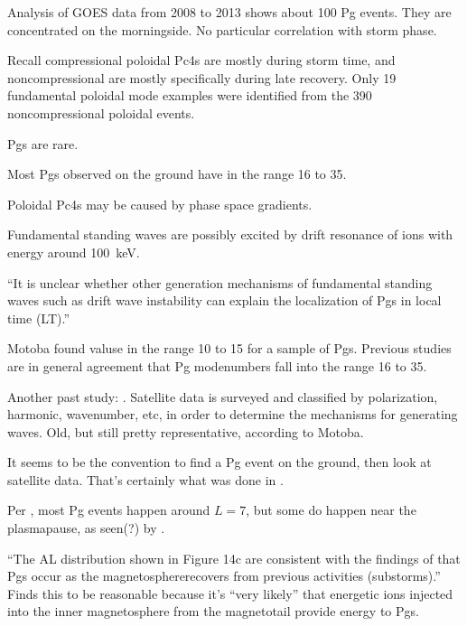 Analysis of GOES data from 2008 to 2013 shows about 100 Pg events. They are concentrated on the morningside. No particular correlation with storm phase\cite{motoba_2015}. 

Recall compressional poloidal Pc4s are mostly during storm time, and noncompressional are mostly specifically during late recovery\cite{dai_2015}. Only 19 fundamental poloidal mode examples were identified from the 390 noncompressional poloidal events. 

Pgs are rare\cite{brekke_1987}. 

Most Pgs observed on the ground have \azm in the range 16 to 35\cite{takahashi_1992}. 

Poloidal Pc4s may be caused by phase space gradients\cite{dai_2013}. 

Fundamental standing waves are possibly excited by drift resonance of ions with energy around \SI{100}{\kilo\eV}\cite{thompson_2001,dai_2013}. 

``It is unclear whether other generation mechanisms of fundamental standing waves such as drift wave instability\cite{green_1979} can explain the localization of Pgs in local time (LT).''\cite{motoba_2015}

Motoba\cite{motoba_2015} found \azm valuse in the range 10 to 15 for a sample of Pgs. Previous studies\cite{rostoker_1979,glassmeier_1980,hillebrand_1982,poulter_1983} are in general agreement that Pg modenumbers fall into the range 16 to 35. 

Another past study: \cite{takahashi_1984}. Satellite data is surveyed and classified by polarization, harmonic, wavenumber, etc, in order to determine the mechanisms for generating \Alfven waves. Old, but still pretty representative, according to Motoba\cite{motoba_2015}. 

It seems to be the convention to find a Pg event on the ground, then look at satellite data. That's certainly what was done in \cite{motoba_2015}. 

Per \cite{motoba_2015}, most Pg events happen around $L=7$, but some do happen near the plasmapause, as seen(?) by \cite{green_1985}. 

``The AL distribution shown in Figure 14c are consistent with the findings of \cite{rostoker_1979} that Pgs occur as the magnetosphererecovers from previous activities (substorms).''\cite{motoba_2015} Finds this to be reasonable because it's ``very likely'' that energetic ions injected into the inner magnetosphere from the magnetotail provide energy to Pgs. 


